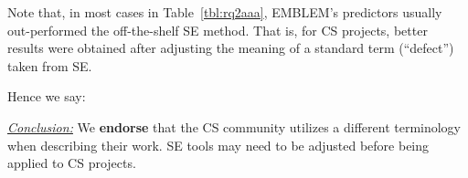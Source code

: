 \documentclass[sigconf]{acmart}
\newenvironment{RQ}{\vspace{1mm}\begin{tcolorbox}[enhanced,width=3.4in,size=fbox,colback=red!5!white,drop shadow southeast,sharp corners]}{\end{tcolorbox}}
\begin{document}
Note that, in most cases in  Table~\ref{tbl:rq2aaa},  EMBLEM's predictors usually out-performed the off-the-shelf SE method. 
That is, for CS projects,
better results were obtained after adjusting the meaning of a standard term (``defect'')
taken from SE.


Hence we say:

\begin{RQ}
\textit{\underline{Conclusion:}} We \textbf{endorse} that the CS community utilizes a different terminology when describing their work. SE tools
may need to be adjusted before being applied to CS projects.
\end{RQ}





\end{document}
